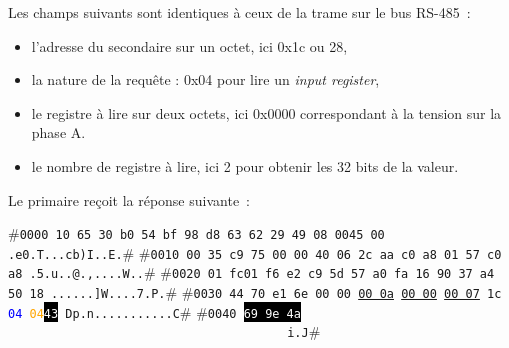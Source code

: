     \vspace{1em}

Les champs suivants sont identiques à ceux de la trame sur le bus RS-485~:
\begin{itemize}
    \item l'adresse du secondaire sur un octet, ici 0x1c ou 28,
    \item la nature de la requête : 0x04 pour lire un \textit{input register},
    \item le registre à lire sur deux octets, ici 0x0000 correspondant à la tension sur la phase A.
    \item le nombre de registre à lire, ici 2 pour obtenir les 32 bits de la valeur.
\end{itemize}

    \vspace{1em}

Le primaire reçoit la réponse suivante~:

\begin{termc}[backgroundcolor=\color{backcolour}, escapechar=#]
#\texttt{\small{0000  \colorbox{purple!50}{10 65 30 b0 54 bf 98 d8 63 62 29 49 08 00}\colorbox{blue!30}{45 00}   .e0.T...cb)I..E.}}# 
#\texttt{\small{0010  \colorbox{blue!30}{00 35 c9 75 00 00 40 06 2c aa c0 a8 01 57 c0 a8}   .5.u..@.,....W..}}# 
#\texttt{\small{0020  \colorbox{blue!30}{01 fc}\colorbox{red!30}{01 f6 e2 c9 5d 57 a0 fa 16 90 37 a4 50 18}   ......]W....7.P.}}# 
#\texttt{\small{0030  \colorbox{red!30}{44 70 e1 6e 00 00} \ul{00 0a} \ul{00 00} \ul{00 07} 1c \textcolor{blue}{04} \textcolor{orange}{04}\colorbox{black}{\textcolor{white}{43}}   Dp.n...........C}}# 
#\texttt{\small{0040  \colorbox{black}{\textcolor{white}{69 9e 4a}} \ \ \ \ \ \ \ \ \ \ \ \ \ \ \ \ \ \ \ \ \ \ \ \ \ \ \ \ \ \ \ \ \ \ \ \ \ \ \ i.J}}# 
                           
\end{termc}

